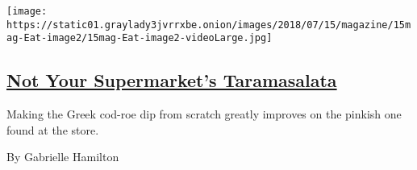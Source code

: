\begin{enumerate}
  \texttt{[image: https://static01.graylady3jvrrxbe.onion/images/2018/07/15/magazine/15mag-Eat-image2/15mag-Eat-image2-videoLarge.jpg]}

  \hypertarget{not-your-supermarkets-taramasalata}{%
  \subsection{\texorpdfstring{\href{/2018/07/10/magazine/not-your-supermarkets-taramasalata.html}{Not
  Your Supermarket's
  Taramasalata}}{Not Your Supermarket's Taramasalata}}\label{not-your-supermarkets-taramasalata}}

  Making the Greek cod-roe dip from scratch greatly improves on the
  pinkish one found at the store.

  By Gabrielle Hamilton
\end{enumerate}

